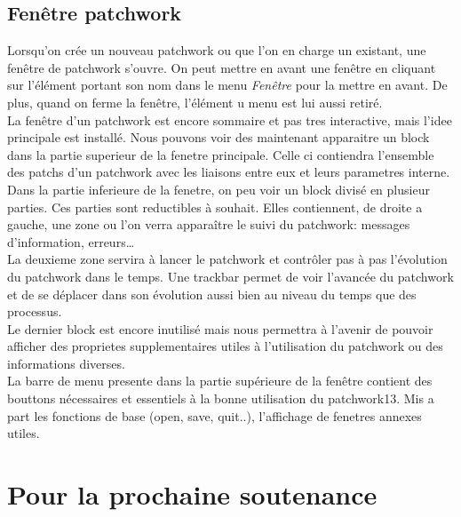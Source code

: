 \documentclass[14pt,a4paper]{report}
\begin{document}
\subsection{Fen\^etre patchwork}

Lorsqu'on cr\'ee un nouveau patchwork ou que l'on en charge un existant,
une fen\^etre de patchwork s'ouvre. On peut mettre en avant une
fen\^etre en cliquant sur l'\'el\'ement portant son nom dans le
menu {\it Fen\^etre} pour la mettre en avant.
De plus, quand on ferme la fen\^etre,
l'\'el\'ement u menu est lui aussi retir\'e. \\

La fen\^etre d'un patchwork est encore sommaire et pas tres interactive, mais 
l'idee principale est install\'e. Nous pouvons voir des maintenant apparaitre 
un block dans la partie superieur de la fenetre principale. Celle ci
contiendra l'ensemble des patchs d'un patchwork avec les
liaisons entre eux et leurs parametres interne. \\

Dans la partie inferieure de la fenetre, on peu voir 
un block divis\'e en plusieur parties. Ces parties sont reductibles \`a
souhait. Elles contiennent, de droite a gauche, une zone ou l'on
verra appara\^itre le 
suivi du patchwork: messages d'information, erreurs\ldots  \\

La deuxieme zone servira 
\`a lancer le patchwork et contr\^oler pas \`a pas l'\'evolution du
patchwork dans le temps.
Une trackbar permet de voir l'avanc\'ee du patchwork et de se d\'eplacer
dans son  \'evolution aussi bien au niveau du temps que des processus. \\

Le dernier block est encore inutilis\'e mais nous permettra \`a 
l'avenir de pouvoir afficher des proprietes supplementaires utiles \`a
l'utilisation du patchwork ou des informations diverses. \\

La barre de menu presente dans la partie sup\'erieure de la fen\^etre
contient des bouttons n\'ecessaires et essentiels \`a la bonne
utilisation du patchwork13. Mis a part les fonctions de base
(open, save, quit..), l'affichage de fenetres annexes utiles.


\newpage

\section{Pour la prochaine soutenance}
\end{document}
